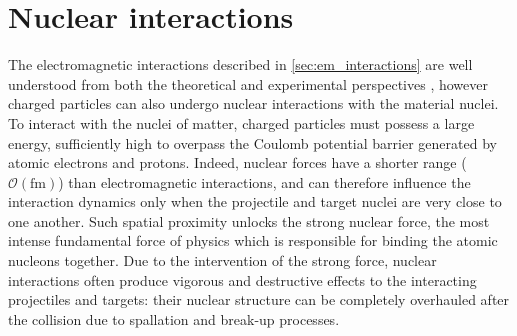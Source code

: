 \section{Nuclear interactions}\label{sec:nucl_interactions}
The electromagnetic interactions described in \autoref{sec:em_interactions} are well understood from both the theoretical and experimental perspectives \cite{10.3389/fonc.2016.00065}, however charged particles can also undergo nuclear interactions with the material nuclei. To interact with the nuclei of matter, charged particles must possess a large energy, sufficiently high to overpass the Coulomb potential barrier generated by atomic electrons and protons. Indeed, nuclear forces have a shorter range ($\mathcal{O}(\text{fm})$) than electromagnetic interactions, and can therefore influence the interaction dynamics only when the projectile and target nuclei are very close to one another. Such spatial proximity unlocks the strong nuclear force, the most intense fundamental force of physics which is responsible for binding the atomic nucleons together. Due to the intervention of the strong force, nuclear interactions often produce vigorous and destructive effects to the interacting projectiles and targets: their nuclear structure can be completely overhauled after the collision due to spallation and break-up processes.

